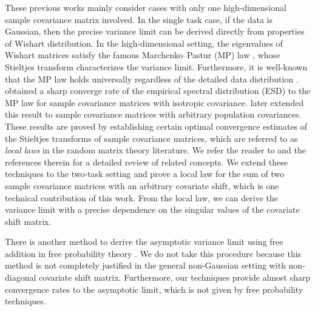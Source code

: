 These previous works mainly consider cases with only one high-dimensional sample covariance matrix involved. %
In the single task case, if the data is Gaussian, then the precise variance limit can be derived directly from properties of Wishart distribution. In the high-dimensional setting, the eigenvalues of Wishart matrices satisfy the famous Marchenko–Pastur (MP) law \cite{MP}, whose Stieltjes transform characterizes the variance limit. Furthermore, it is well-known that the MP law holds universally regardless of the detailed data distribution \cite{bai2010spectral}. \cite{isotropic} obtained a sharp converge rate of the empirical spectral distribution (ESD) to the MP law for sample covariance matrices with isotropic covariance. \cite{Anisotropic,DY} later extended this result to sample covariance matrices with arbitrary population covariances. These results are proved by establishing certain optimal convergence estimates of the Stieltjes transforms of sample covariance matrices, which are referred to as \emph{local laws} in the random matrix theory literature. We refer the reader to \cite{erdos2017dynamical} and the references therein for a detailed review of related concepts. We extend these techniques to the two-task setting and prove a local law for the sum of two sample covariance matrices with an arbitrary covariate shift, which is one technical contribution of this work. From the local law, we can derive the variance limit with a precise dependence on the singular values of the covariate shift matrix. 




There is another method to derive the asymptotic variance limit using free addition in free probability theory \cite{nica2006lectures}. We do not take this procedure because this method is not completely justified in the general non-Gaussian setting with non-diagonal covariate shift matrix. 
Furthermore, our techniques provide almost sharp convergence rates to the asymptotic limit, which is not given by free probability techniques. 

